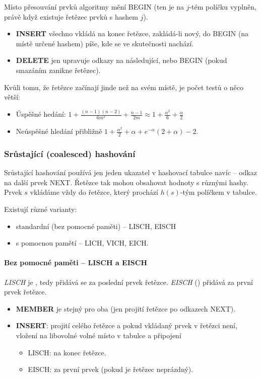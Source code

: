 \documentclass[11pt]{report} %
\numberwithin{equation}{section}
\begin{document}
Místo přesouvání prvků algoritmy mění BEGIN (ten je na $j$-tém políčku vyplněn, právě když existuje řetězec prvků s hashem $j$).

\begin{itemize}
	\item \textbf{INSERT} všechno vkládá na konec řetězce, zakládá-li nový, do
	BEGIN (na místě určené hashem) píše, kde se ve skutečnosti nachází.
	\item \textbf{DELETE} jen upravuje odkazy na následující, nebo BEGIN (pokud
smazáním zanikne řetězec).
\end{itemize}

Kvůli tomu, že řetězce začínají jinde než na svém místě, je počet testů o něco větší:

\begin{itemize}
	
	\item
	Úspěšné hedání:
	$1+\frac{(n-1)(n-2)}{6m^2} + \frac{n-1}{2m}\approx 1 + \frac{\alpha^2}{6} + \frac{\alpha}{2}$
	\item
	Neúspěšné hledání přibližně
	$1+\frac{\alpha^2}{2}+\alpha+e^{-\alpha}(2+\alpha)-2$.
\end{itemize}

\subsubsection{Srůstající (coalesced) hashování}
Srůstající hashování používá jen jeden ukazatel v hashovací tabulce navíc -- odkaz na další prvek NEXT. Řetězce tak mohou obsahovat hodnoty s různými hashy. Prvek $s$ vkládáme vždy do řetězce, který prochází $h(s)$-tým políčkem v tabulce.

Existují různé varianty:

\begin{itemize}
	\item standardní (bez pomocné paměti) -- LISCH, 	EISCH
	\item  s pomocnou pamětí -- LICH, VICH, EICH.
\end{itemize}

\paragraph{Bez pomocné paměti -- LISCH a EISCH}

\emph{LISCH} je , tedy přidává se za poslední prvek řetězce. \emph{EISCH} () přidává za první prvek řetězce.

\begin{itemize}	
	\item \textbf{MEMBER} je stejný pro oba (jen projití řetězce po
	odkazech NEXT).
	\item \textbf{INSERT}: projití celého řetězce a pokud vkládaný prvek v řetězci není, vložení na libovolné volné místo v tabulce a připojení
	\begin{itemize}
		\item LISCH: na konec řetězce.
		\item EISCH: za první prvek (pokud je řetězec neprázdný).
	\end{itemize}
\end{itemize}
\end{document}
